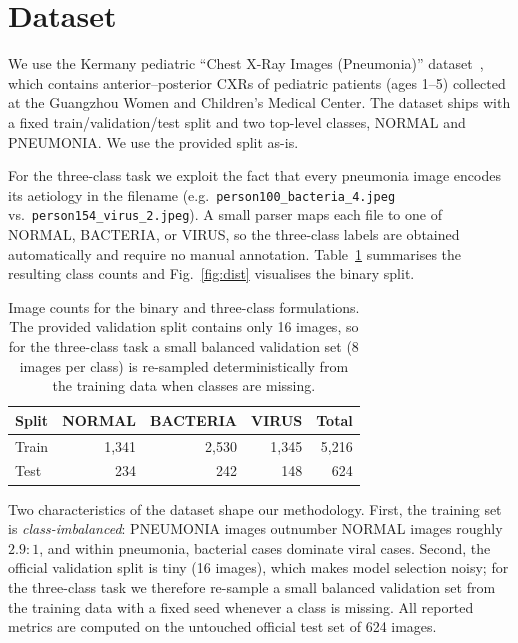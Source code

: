 \documentclass[runningheads]{llncs}
\begin{document}
\section{Dataset}

We use the Kermany pediatric ``Chest X-Ray Images
(Pneumonia)'' dataset~\cite{ref_kermany,ref_kaggle}, which contains
anterior--posterior CXRs of pediatric patients (ages 1--5) collected at the
Guangzhou Women and Children's Medical Center. The dataset ships with a
fixed train/validation/test split and two top-level classes, NORMAL and
PNEUMONIA. We use the provided split as-is.

For the three-class task we exploit the fact that every pneumonia image
encodes its aetiology in the filename
(e.g.\ \texttt{person100\_bacteria\_4.jpeg} vs.\
\texttt{person154\_virus\_2.jpeg}). A small parser maps each file to one of
NORMAL, BACTERIA, or VIRUS, so the three-class labels are obtained
automatically and require no manual annotation. Table~\ref{tab:dataset}
summarises the resulting class counts and Fig.~\ref{fig:dist} visualises
the binary split.

\begin{table}[!ht]
\caption{Image counts for the binary and three-class formulations. The
provided validation split contains only 16 images, so for the three-class
task a small balanced validation set (8 images per class) is re-sampled
deterministically from the training data when classes are missing.}
\label{tab:dataset}
\centering
\begin{tabular}{lrrrr}
\toprule
Split & NORMAL & BACTERIA & VIRUS & Total \\
\midrule
Train & 1{,}341 & 2{,}530 & 1{,}345 & 5{,}216 \\
Test  & 234     & 242     & 148     & 624 \\
\bottomrule
\end{tabular}
\end{table}

Two characteristics of the dataset shape our methodology. First, the
training set is \emph{class-imbalanced}: PNEUMONIA images outnumber NORMAL
images roughly $2.9\!:\!1$, and within pneumonia, bacterial cases dominate
viral cases. Second, the official validation split is tiny (16 images),
which makes model selection noisy; for the three-class task we therefore
re-sample a small balanced validation set from the training data with a
fixed seed whenever a class is missing. All reported metrics are computed
on the untouched official test set of 624 images.
\end{document}
